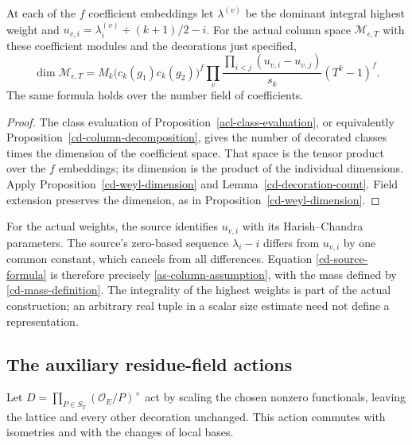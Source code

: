 \begin{theorem}\label{cd-source-dimension}
At each of the $f$ coefficient embeddings let
$\lambda^{(v)}$ be the dominant integral highest weight and
$u_{v,i}=\lambda^{(v)}_i+(k+1)/2-i$. For the actual column
space $\mathcal M_{\epsilon,T}$ with these coefficient modules
and the decorations just specified,
\begin{equation}\label{cd-source-formula}
 \dim\mathcal M_{\epsilon,T}
   =M_k\bigl(c_k(g_1)c_k(g_2)\bigr)^f
           \prod_v\frac{\prod_{i<j}(u_{v,i}-u_{v,j})}{s_k}
                           (T^k-1)^f.
\end{equation}
The same formula holds over the number field of coefficients.
\end{theorem}
\begin{proof}
The class evaluation of Proposition~\ref{acl-class-evaluation},
or equivalently Proposition~\ref{cd-column-decomposition},
gives the number of decorated classes times the dimension of
the coefficient space. That space is the tensor product over
the $f$ embeddings; its dimension is the product of the individual
dimensions. Apply Proposition~\ref{cd-weyl-dimension} and
Lemma~\ref{cd-decoration-count}. Field extension preserves the
dimension, as in Proposition~\ref{cd-weyl-dimension}.
\end{proof}

For the actual weights, the source identifies $u_{v,i}$ with its
Harish--Chandra parameters. The source's zero-based sequence
$\lambda_i-i$ differs from $u_{v,i}$ by one common constant,
which cancels from all differences. Equation
\eqref{cd-source-formula} is therefore precisely
\eqref{as-column-assumption}, with the mass defined by
\eqref{cd-mass-definition}. The integrality of the highest weights
is part of the actual construction; an arbitrary real tuple in
a scalar size estimate need not define a representation.

\subsection{The auxiliary residue-field actions}

Let
$D=\prod_{P\in S_T}(\mathcal O_E/P)^\times$
act by scaling the chosen nonzero functionals, leaving the lattice
and every other decoration unchanged. This action commutes with
isometries and with the changes of local bases.

